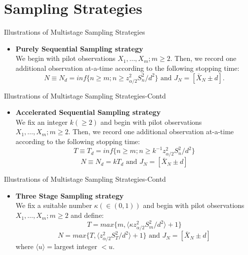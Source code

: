 \documentclass [xcolor=svgnames, t] {beamer}
\begin{document}
\section{Sampling Strategies}
\begin{frame}{Illustrations of Multistage Sampling Strategies}
  \vspace{5mm}
    \begin{itemize}
    \item \textbf{Purely Sequential Sampling strategy}
\\ We begin with pilot observations $X_1,\dots ,X_m; m\ge 2$. Then, we record one additional observation 
at-a-time according to the following stopping time:
\begin{equation*}
    N \equiv N_d=inf\{ n \ge m; n \ge z^2_{\alpha/2}S_n^2/d^2 \}  \textrm{ and }  J_N=[\bar{X}_N \pm d].
\end{equation*}
    \end{itemize}
\end{frame}
\begin{frame}{Illustrations of Multistage Sampling Strategies-Contd}
  \vspace{5mm}
    \begin{itemize}
 \item \textbf{Accelerated Sequential Sampling strategy}\\
We fix an integer $k(\geq 2)$ and begin with pilot observations $X_1,\dots ,X_m; m\ge 2$. Then, we record 
one additional observation at-a-time according to the following stopping time:        
        $$ T \equiv T_d=inf\{ n \ge m; n \ge k^{-1}z^2_{\alpha/2}S_n^2/d^2 \} $$ 
        $$ N \equiv N_d = kT_d  \text{ and } J_N=[\bar{X}_N \pm d] $$
    \end{itemize}
\end{frame}
\begin{frame}{Illustrations of Multistage Sampling Strategies-Contd}
  \vspace{5mm}
    \begin{itemize}
 
\item \textbf{Three Stage Sampling strategy}\\
We fix a suitable number $\kappa(\in (0,1))$ and begin with pilot observations $X_1,\dots ,X_m; m\ge 2$ and define:
        $$ T =max\{  m,  \langle \kappa z^2_{\alpha/2}S_m^2/d^2 \rangle+1\} $$ 
        $$ N =max \{ T,  \langle z^2_{\alpha/2}S_T^2/d^2 \rangle+1\}  \text{ and } J_N=[\bar{X}_N \pm d] $$
        where $\langle u \rangle = $largest integer $< u$.
    \end{itemize}
\end{frame}
\end{document}
